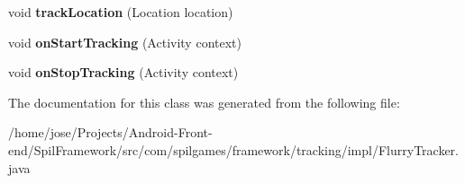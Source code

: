 \begin{DoxyCompactItemize}
\item 
\hypertarget{classcom_1_1spilgames_1_1framework_1_1tracking_1_1impl_1_1_flurry_tracker_a3c4e5aaca2cab8d02f8a042bf8264042}{void {\bfseries track\-Location} (Location location)}\label{classcom_1_1spilgames_1_1framework_1_1tracking_1_1impl_1_1_flurry_tracker_a3c4e5aaca2cab8d02f8a042bf8264042}

\item 
\hypertarget{classcom_1_1spilgames_1_1framework_1_1tracking_1_1impl_1_1_flurry_tracker_a664e2d1ae63e4ab8f2a5767e577792a4}{void {\bfseries on\-Start\-Tracking} (Activity context)}\label{classcom_1_1spilgames_1_1framework_1_1tracking_1_1impl_1_1_flurry_tracker_a664e2d1ae63e4ab8f2a5767e577792a4}

\item 
\hypertarget{classcom_1_1spilgames_1_1framework_1_1tracking_1_1impl_1_1_flurry_tracker_a72f9084aefc48065207161e8a2e0d75e}{void {\bfseries on\-Stop\-Tracking} (Activity context)}\label{classcom_1_1spilgames_1_1framework_1_1tracking_1_1impl_1_1_flurry_tracker_a72f9084aefc48065207161e8a2e0d75e}

\end{DoxyCompactItemize}


The documentation for this class was generated from the following file\-:\begin{DoxyCompactItemize}
\item 
/home/jose/\-Projects/\-Android-\/\-Front-\/end/\-Spil\-Framework/src/com/spilgames/framework/tracking/impl/Flurry\-Tracker.\-java\end{DoxyCompactItemize}
